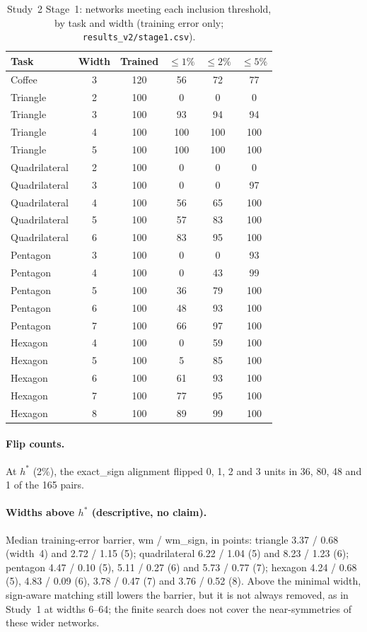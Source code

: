 \documentclass[11pt]{article}
\newcommand{\md}[1]{\textsf{#1}}
\begin{document}
\begin{table}[H]
\centering\small
\caption{Study~2 Stage~1: networks meeting each inclusion threshold, by task and width (training error only; \texttt{results\_v2/stage1.csv}).}
\begin{tabular}{@{}lccccc@{}}
\toprule
Task & Width & Trained & $\le 1\%$ & $\le 2\%$ & $\le 5\%$ \\
\midrule
Coffee & 3 & 120 & 56 & 72 & 77 \\
Triangle & 2 & 100 & 0 & 0 & 0 \\
Triangle & 3 & 100 & 93 & 94 & 94 \\
Triangle & 4 & 100 & 100 & 100 & 100 \\
Triangle & 5 & 100 & 100 & 100 & 100 \\
Quadrilateral & 2 & 100 & 0 & 0 & 0 \\
Quadrilateral & 3 & 100 & 0 & 0 & 97 \\
Quadrilateral & 4 & 100 & 56 & 65 & 100 \\
Quadrilateral & 5 & 100 & 57 & 83 & 100 \\
Quadrilateral & 6 & 100 & 83 & 95 & 100 \\
Pentagon & 3 & 100 & 0 & 0 & 93 \\
Pentagon & 4 & 100 & 0 & 43 & 99 \\
Pentagon & 5 & 100 & 36 & 79 & 100 \\
Pentagon & 6 & 100 & 48 & 93 & 100 \\
Pentagon & 7 & 100 & 66 & 97 & 100 \\
Hexagon & 4 & 100 & 0 & 59 & 100 \\
Hexagon & 5 & 100 & 5 & 85 & 100 \\
Hexagon & 6 & 100 & 61 & 93 & 100 \\
Hexagon & 7 & 100 & 77 & 95 & 100 \\
Hexagon & 8 & 100 & 89 & 99 & 100 \\
\bottomrule
\end{tabular}
\end{table}

\paragraph{Flip counts.} At $h^*$ (2\%), the \md{exact\_sign} alignment flipped 0, 1, 2 and 3 units in 36, 80, 48 and 1 of the 165 pairs.

\paragraph{Widths above $h^*$ (descriptive, no claim).} Median training-error barrier, \md{wm} / \md{wm\_sign}, in points: triangle 3.37 / 0.68 (width~4) and 2.72 / 1.15 (5); quadrilateral 6.22 / 1.04 (5) and 8.23 / 1.23 (6); pentagon 4.47 / 0.10 (5), 5.11 / 0.27 (6) and 5.73 / 0.77 (7); hexagon 4.24 / 0.68 (5), 4.83 / 0.09 (6), 3.78 / 0.47 (7) and 3.76 / 0.52 (8). Above the minimal width, sign-aware matching still lowers the barrier, but it is not always removed, as in Study~1 at widths 6--64; the finite search does not cover the near-symmetries of these wider networks.
\end{document}
